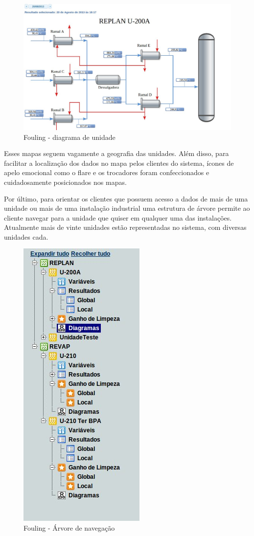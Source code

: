 \documentclass[]{article}
\begin{document}
\begin{figure}[!ht]
\centering
\includegraphics[scale=0.4]{./fouling_diagrama}
\caption{Fouling - diagrama de unidade}
\label{fig:fouling_diagrama}
\end{figure}

Esses mapas seguem vagamente a geografia das unidades. Além disso,  para facilitar a localização dos dados no mapa pelos clientes do sistema, ícones de apelo emocional como o flare e os trocadores foram confeccionados e cuidadosamente posicionados nos mapas.

Por último, para orientar os clientes que possuem acesso a dados de mais de uma unidade ou mais de uma instalação industrial uma estrutura de árvore permite ao cliente navegar para a unidade que quiser em qualquer uma das instalações. Atualmente mais de vinte unidades estão representadas no sistema, com diversas unidades cada.

\begin{figure}[!ht]
\centering
\includegraphics[scale=.5]{./fouling_arvore}
\caption{Fouling - Árvore de navegação}
\label{fig:fouling_arvore}
\end{figure}
\end{document}
